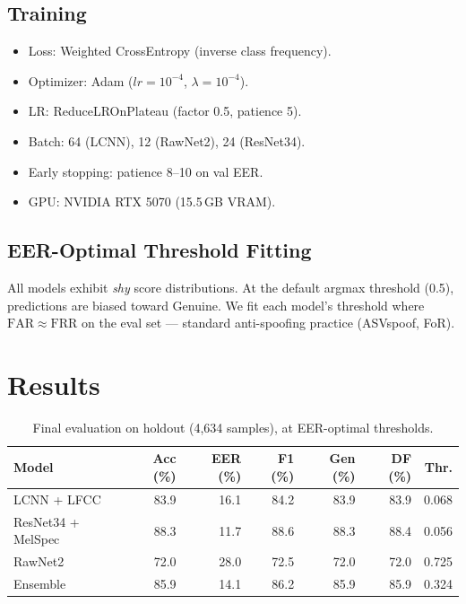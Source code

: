 \documentclass[12pt,a4paper]{article}
\begin{document}
\subsection{Training}

\begin{itemize}
  \item Loss: Weighted CrossEntropy (inverse class frequency).
  \item Optimizer: Adam ($lr=10^{-4}$, $\lambda=10^{-4}$).
  \item LR: ReduceLROnPlateau (factor 0.5, patience 5).
  \item Batch: 64 (LCNN), 12 (RawNet2), 24 (ResNet34).
  \item Early stopping: patience 8--10 on val EER.
  \item GPU: NVIDIA RTX 5070 (15.5\,GB VRAM).
\end{itemize}

\subsection{EER-Optimal Threshold Fitting}

All models exhibit \emph{shy} score distributions. At the default argmax
threshold (0.5), predictions are biased toward Genuine. We fit each model's
threshold where $\mathrm{FAR}\approx\mathrm{FRR}$ on the eval set —
standard anti-spoofing practice (ASVspoof, FoR).

\section{Results}

\begin{table}[H]
\centering
\caption{Final evaluation on holdout (4,634 samples), at EER-optimal thresholds.}
\label{tab:results}
\begin{tabular}{lrrrrrr}
\toprule
Model & Acc (\%) & EER (\%) & F1 (\%) & Gen (\%) & DF (\%) & Thr. \\
\midrule
LCNN + LFCC       & 83.9 & 16.1 & 84.2 & 83.9 & 83.9 & 0.068 \\
ResNet34 + MelSpec& 88.3 & 11.7 & 88.6 & 88.3 & 88.4 & 0.056 \\
RawNet2           & 72.0 & 28.0 & 72.5 & 72.0 & 72.0 & 0.725 \\
Ensemble          & 85.9 & 14.1 & 86.2 & 85.9 & 85.9 & 0.324 \\
\bottomrule
\end{tabular}
\end{table}
\end{document}
